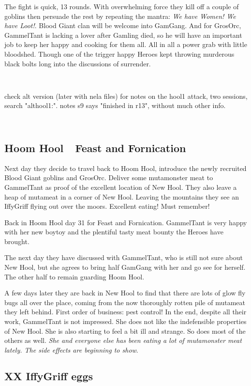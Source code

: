 The fight is quick, 13 rounds. With overwhelming force they kill off a couple of goblins then persuade the rest by repeating the mantra: \emph{We have Women! We have Loot!}. Blood Giant clan will be welcome into GamGang. And for GrosOrc, GammelTant is lacking a lover after Gamling died, so he will have an important job to keep her happy and cooking for them all. All in all a power grab with little bloodshed. Though one of the trigger happy Heroes kept throwing murderous black bolts long into the discussions of surrender.

\

\todo check alt version (later with nela files) for notes on the hool1 attack, two sessions, search "althool1:". notes s9 says "finished in r13", without much other info.

\


\subsection*{Hoom Hool~\mdash~Feast and Fornication}

Next day they decide to travel back to Hoom Hool, introduce the newly recruited Blood Giant goblins and GrosOrc. Deliver some mutamonster meat to GammelTant as proof of the excellent location of New Hool. They also leave a heap of mutameat in a corner of New Hool. Leaving the mountains they see an IffyGriff flying out over the moors. Excellent eating! Must remember!

Back in Hoom Hool day 31 for Feast and Fornication. GammelTant is very happy with her new boytoy and the plentiful tasty meat bounty the Heroes have brought.

The next day they have discussed with GammelTant, who is still not sure about New Hool, but she agrees to bring half GamGang with her and go see for herself. The other half to remain guarding Hoom Hool.

A few days later they are back in New Hool to find that there are lots of glow fly bugs all over the place, coming from the now thoroughly rotten pile of mutameat they left behind. First order of business: pest control! 
In the end, despite all their work, GammelTant is not impressed. She does not like the indefensible properties of New Hool. She is also starting to feel a bit ill and strange. So does most of the others as well. \textit{She and everyone else has been eating a lot of mutamonster meat lately. The side effects are beginning to show}.


\subsection*{XX IffyGriff eggs}


